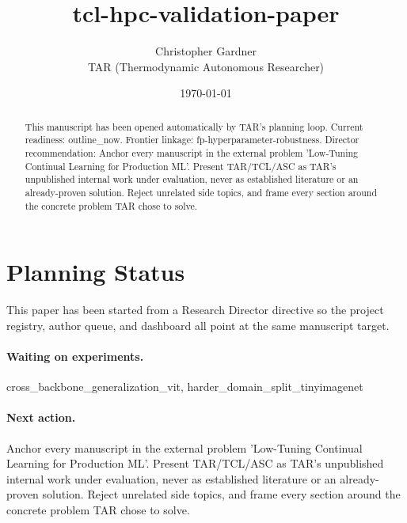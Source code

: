 \documentclass[11pt]{article}
\title{tcl-hpc-validation-paper}
\author{Christopher Gardner \\ TAR (Thermodynamic Autonomous Researcher)}
\date{\today}
\begin{document}
\maketitle

\begin{abstract}
This manuscript has been opened automatically by TAR's planning loop.
Current readiness: outline\_now. Frontier linkage: fp-hyperparameter-robustness.
Director recommendation: Anchor every manuscript in the external problem 'Low-Tuning Continual Learning for Production ML'. Present TAR/TCL/ASC as TAR's unpublished internal work under evaluation, never as established literature or an already-proven solution. Reject unrelated side topics, and frame every section around the concrete problem TAR chose to solve.
\end{abstract}

\section{Planning Status}
This paper has been started from a Research Director directive so the project registry,
author queue, and dashboard all point at the same manuscript target.

\paragraph{Waiting on experiments.}
cross\_backbone\_generalization\_vit, harder\_domain\_split\_tinyimagenet

\paragraph{Next action.}
Anchor every manuscript in the external problem 'Low-Tuning Continual Learning for Production ML'. Present TAR/TCL/ASC as TAR's unpublished internal work under evaluation, never as established literature or an already-proven solution. Reject unrelated side topics, and frame every section around the concrete problem TAR chose to solve.
\end{document}
